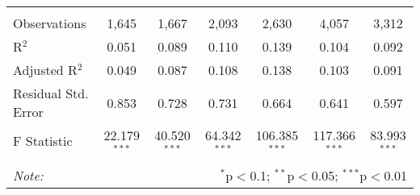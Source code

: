 \documentclass[alpha-refs]{wiley-article-04t}
\begin{document}
\begin{table}[!htbp]
\begin{tabular}{@{\extracolsep{5pt}}lcccccc}
  & & & & & & \\ 
\hline \\[-1.8ex] 
Observations & 1,645 & 1,667 & 2,093 & 2,630 & 4,057 & 3,312 \\ 
R$^{2}$ & 0.051 & 0.089 & 0.110 & 0.139 & 0.104 & 0.092 \\ 
Adjusted R$^{2}$ & 0.049 & 0.087 & 0.108 & 0.138 & 0.103 & 0.091 \\ 
Residual Std. Error & 0.853 & 0.728 & 0.731 & 0.664 & 0.641 & 0.597 \\ 
F Statistic & 22.179$^{***}$ & 40.520$^{***}$ & 64.342$^{***}$ & 106.385$^{***}$ & 117.366$^{***}$ & 83.993$^{***}$ \\ 
\hline 
\hline \\[-1.8ex] 
\textit{Note:}  & \multicolumn{6}{r}{$^{*}$p$<$0.1; $^{**}$p$<$0.05; $^{***}$p$<$0.01} \\ 
\end{tabular} 
\end{table} 
\end{document}
